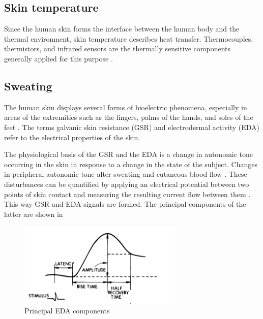 \subsection{Skin temperature}
\label{subsec:setup:phys-signals:temp}

Since the human skin forms the interface between the human body and
the thermal environment, skin temperature describes heat
transfer. Thermocouples, thermistors, and infrared sensors are the
thermally sensitive components generally applied for this
purpose \cite{van2006evaluation}.


\subsection{Sweating}
\label{subsec:setup:phys-signals:eda}

The human skin displays several forms of bioelectric phenomena,
especially in areas of the extremities such as the fingers, palms of
the hands, and soles of the feet \cite{PoligraphLesson}. The terms
galvanic skin resistance (GSR) and electrodermal activity (EDA) refer
to the electrical properties of the skin.


The physiological basis of the GSR and the EDA is a change in
autonomic tone occurring in the skin in response to a change in the
state of the subject. Changes in peripheral autonomic tone alter
sweating and cutaneous blood flow \cite{PoligraphLesson}. These
disturbances can be quantified by applying an electrical potential
between two points of skin contact and measuring the resulting current
flow between them \cite{braithwaite2013guide}. This way GSR and EDA
signals are formed. The principal components of the latter are shown
in 

\begin{figure}[!ht]
\centering
\includegraphics[width=0.7\textwidth]{images/EDAcomponents.png}
\caption{Principal EDA components}
\label{fig:EDAcomponents}
\end{figure}
